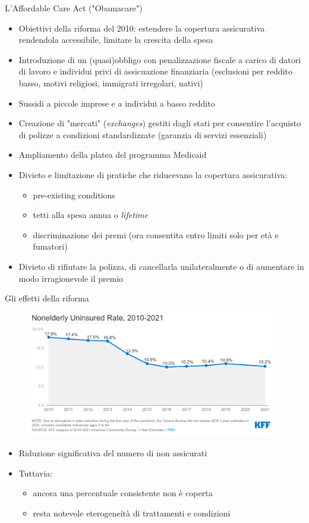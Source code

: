 \documentclass[aspectratio=64,11pt]{beamer}
\begin{document}
\begin{frame}{L'Affordable Care Act ("Obamacare")}
\small
\begin{itemize}
\item Obiettivi della riforma del 2010: estendere la copertura assicurativa
rendendola accessibile, limitare la crescita della spesa
\item Introduzione di un (quasi)obbligo con penalizzazione fiscale a carico di
datori di lavoro e individui privi di assicuazione finanziaria (esclusioni
per reddito basso, motivi religiosi, immigrati irregolari, nativi)
\item Sussidi a piccole imprese e a individui a basso reddito
\item Creazione di "mercati" (\emph{exchanges}) gestiti dagli stati per consentire
l'acquisto di polizze a condizioni standardizzate (garanzia di servizi
essenziali)
\item Ampliamento della platea del programma Medicaid
\item Divieto e limitazione di pratiche che riducevano la copertura assicurativa:
\begin{itemize}
\item pre-existing conditions
\item tetti alla spesa annua o \emph{lifetime}
\item discriminazione dei premi (ora consentita entro limiti solo per età e
fumatori)
\end{itemize}
\item Divieto di rifiutare la polizza, di cancellarla unilateralmente o di
aumentare in modo irragionevole il premio
\end{itemize}
\end{frame}

\begin{frame}{Gli effetti della riforma}
\begin{figure}[htbp]
\centering
\includegraphics[height=5.5cm]{./figure/nonelderly-uninsured-rate.png}
\end{figure}

\begin{itemize}
\item Riduzione significativa del numero di non assicurati
\item Tuttavia:
\begin{itemize}
\item ancora una percentuale consistente non è coperta
\item resta notevole eterogeneità di trattamenti e condizioni
\end{itemize}
\end{itemize}
\end{frame}
\end{document}
